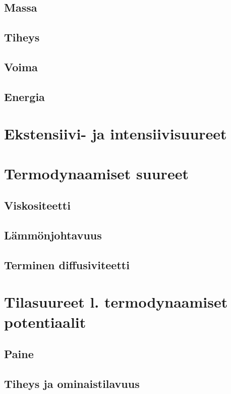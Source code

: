 \documentclass[12pt,a4paper,finnish]{book}
\begin{document}
\subsection{Massa}

\subsection{Tiheys}

\subsection{Voima}

\subsection{Energia}

\section{Ekstensiivi- ja intensiivisuureet}

\section{Termodynaamiset suureet}

\subsection{Viskositeetti}

\subsection{Lämmönjohtavuus}

\subsection{Terminen diffusiviteetti}

\section{Tilasuureet l. termodynaamiset potentiaalit} 

\subsection{Paine}

\subsection{Tiheys ja ominaistilavuus}
\end{document}
